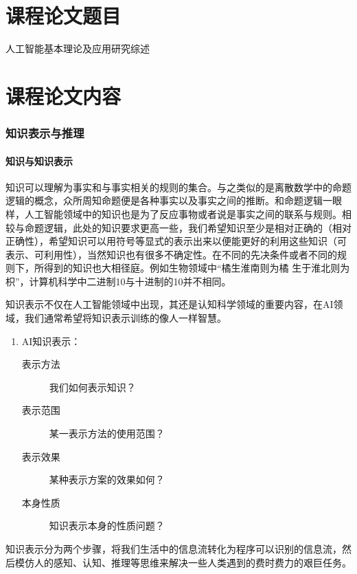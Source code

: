 \documentclass[12pt,a4paper,UTF8]{ctexart}
\begin{document}
\tableofcontents

\part{课程论文题目}
人工智能基本理论及应用研究综述

\part{课程论文内容}
\section{知识表示与推理}
\subsection{知识与知识表示}
\textrm{知识可以理解为事实和与事实相关的规则的集合。与之类似的是离散数学中的命题逻辑的概念，众所周知命题便是各种事实以及事实之间的推断。和命题逻辑一眼样，人工智能领域中的知识也是为了反应事物或者说是事实之间的联系与规则。相较与命题逻辑，此处的知识要求更高一些，我们希望知识至少是相对正确的（相对正确性），希望知识可以用符号等显式的表示出来以便能更好的利用这些知识（可表示、可利用性），当然知识也有很多不确定性。在不同的先决条件或者不同的规则下，所得到的知识也大相径庭。例如生物领域中“橘生淮南则为橘 生于淮北则为枳”，计算机科学中二进制10与十进制的10并不相同。}

\textrm{知识表示不仅在人工智能领域中出现，其还是认知科学领域的重要内容，在AI领域，我们通常希望将知识表示训练的像人一样智慧。}

\begin{enumerate}
    \item AI知识表示：
    \begin{description}
        \item [表示方法] 我们如何表示知识？
        \item [表示范围] 某一表示方法的使用范围？
        \item [表示效果] 某种表示方案的效果如何？
        \item [本身性质] 知识表示本身的性质问题？
    \end{description}
\end{enumerate}

知识表示分为两个步骤，将我们生活中的信息流转化为程序可以识别的信息流，然后模仿人的感知、认知、推理等思维来解决一些人类遇到的费时费力的艰巨任务。
\end{document}
